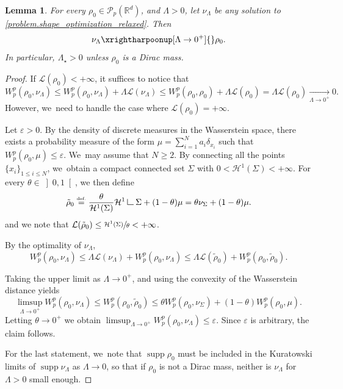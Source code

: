 \documentclass[JEP,XML,SOM,Unicode,NoFloatCountersInSection,published]{cedram}
\newtheorem{lemma}[theorem]{Lemma}
\theoremstyle{definition}
\newcommand{\eqdef}{\ensuremath{\stackrel{\mbox{\upshape\tiny def.}}{=}}}
\newcommand\LM[1]{\hbox{\vrule width.5pt \vbox to#1pt{\vfill \hrule width#1pt height.5pt}}}
\newcommand\LL{{\mathchoice {\>\LM7\>}{\>\LM7\>}{\,\LM5\,}{\,\LM{3.35}\,}}}
\newcommand{\mres}{\LL}
\newcommand\cH{\mathcal{H}}
\newcommand\cL{\mathcal{L}}
\newcommand{\RR}{\mathbb{R}}
\DeclareMathOperator{\supp}{supp}
\newcommand{\oi}[2]{ \left] #1, #2 \right[ }
\begin{document}
\begin{lemma}\label{lemma.cvLambdazero}
For every $\rho_0 \in \mathcal{P}_p(\RR^d)$, and $\Lambda>0$, let $\nu_\Lambda$ be any solution to \eqref{problem.shape_optimization_relaxed}. Then
\begin{equation*}
\nu_\Lambda\xrightharpoonup[\Lambda \to 0^+]{} \rho_0.
\end{equation*}
In particular, $\Lambda_\star>0$ unless $\rho_0$ is a Dirac mass.
\end{lemma}

\begin{proof}
If $\cL(\rho_0)<+\infty$, it suffices to notice that
\begin{equation*}
W_p^p(\rho_0, \nu_\Lambda)\leq W_p^p(\rho_0, \nu_\Lambda) + \Lambda \mathcal{L}(\nu_\Lambda) \leq W_p^p(\rho_0, \rho_0) + \Lambda \mathcal{L}(\rho_0) = \Lambda \mathcal{L}(\rho_0)\xrightarrow[\Lambda\to 0^+]{} 0.
\end{equation*}
However, we~need to handle the case where $\cL(\rho_0)=+\infty$.

Let $\varepsilon>0$. By the density of discrete measures in the Wasserstein space, there exists a probability measure of the form $\mu =\sum_{i=1}^{N} a_i \delta_{x_i}$ such that $W_p^p(\rho_0,\mu)\leq \varepsilon$. We~may assume that $N\geq 2$. By connecting all the points $\{x_{i}\}_{1\leq i\leq N}$, we~obtain a compact connected set $\Sigma$ with $0<\cH^1(\Sigma)<+\infty$. For every $\theta \in \oi{0}{1}$,
we then define
\begin{equation*}
\tilde{\rho}_0\eqdef \frac{\theta}{\cH^1(\Sigma)} \cH^1 \mres\Sigma + (1-\theta)\mu
= \theta \nu_\Sigma + (1-\theta)\mu.
\end{equation*}
and we note that
$\cL(\tilde{\rho}_0)\le \sfrac{\cH^1(\Sigma)}{\theta}<+\infty$.

By the optimality of $\nu_{\Lambda}$,
\begin{equation*}
W_p^p(\rho_0,\nu_{\Lambda})\le \Lambda \cL(\nu_{\Lambda})+ W_p^p(\rho_0,\nu_{\Lambda})\le \Lambda \cL(\tilde{\rho}_0)+ W_p^p(\rho_0,\tilde{\rho}_0).
\end{equation*}

Taking the upper limit as $\Lambda\to 0^+$, and using the convexity of the Wasserstein distance yields
\begin{equation*}
\limsup_{\Lambda \to 0^+} W_p^p(\rho_0,\nu_\Lambda)
\le W_p^p(\rho_0,\tilde{\rho}_0) \le
\theta W_p^p\left(\rho_0,\nu_\Sigma\right) +
(1-\theta) W_p^p(\rho_0,\mu).
\end{equation*}
Letting $\theta\to 0^+$ we obtain $\limsup_{\Lambda \to 0^+} W_p^p(\rho_0,\nu_\Lambda)\leq \varepsilon$. Since $\varepsilon$ is arbitrary, the claim follows.

For the last statement, we~note that $\supp \rho_0$ must
be included in the Kuratowski limits of $\supp \nu_\Lambda$ as $\Lambda\to 0$,
so that if $\rho_0$ is not a Dirac mass, neither is $\nu_\Lambda$ for $\Lambda>0$ small enough.
\end{proof}
\end{document}
